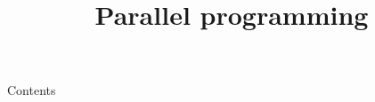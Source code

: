 
\newcommand{\topic}{
	Parallel programming
}

\title{\topic}
\supertitle{\course}
\date{}



\maketitle

\begin{frame}{Contents}
	\tableofcontents
\end{frame}



